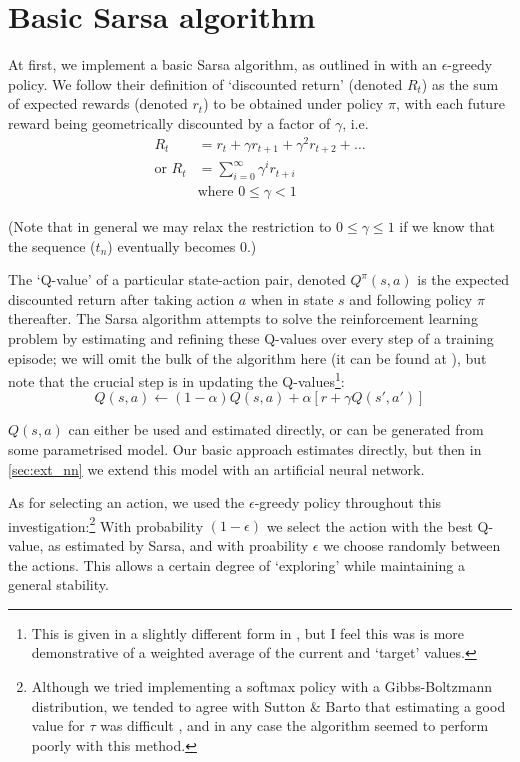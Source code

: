 \documentclass[a4paper, 11pt, twocolumn, final]{article} %
\begin{document}
\section{Basic Sarsa algorithm} At first, we implement a basic Sarsa algorithm, as
outlined in \cite[Chapter~6]{Sutton1998} with an $\epsilon$-greedy policy.  We
follow their definition of `discounted return' (denoted $R_t$) as the sum of
expected rewards (denoted $r_t$) to be obtained under policy $\pi$, with each
future reward being geometrically discounted by a factor of $\gamma$, i.e.
\begin{align}
R_t &= r_t + \gamma r_{t+1} + \gamma^2 r_{t+2} + \ldots \nonumber \\
\text{or } R_t &= \sum_{i=0}^{\infty}{\gamma^ir_{t+i}} \\
&\text{where }0 \le \gamma < 1 \nonumber
\end{align}

(Note that in general we may relax the restriction to $0 \le \gamma \le 1$ if we
know that the sequence ($t_n$) eventually becomes 0.)

The `Q-value' of a particular state-action pair, denoted $Q^\pi(s, a)$ is the
expected discounted return after taking action $a$ when in state $s$ and
following policy $\pi$ thereafter.  The Sarsa algorithm attempts to solve the
reinforcement learning problem by estimating and refining these Q-values over
every step of a training episode; we will omit the bulk of the algorithm here
(it can be found at \cite[p.~146]{Sutton1998}), but note that the crucial step
is in updating the Q-values\footnote{This is given in a slightly different form
in \cite{Sutton1998}, but I feel this was is more demonstrative of a weighted
average of the current and `target' values.}:
\begin{equation}
Q(s, a) \leftarrow (1-\alpha)Q(s, a) + \alpha[r + \gamma Q(s', a')]
\end{equation}

$Q(s, a)$ can either be used and estimated directly, or can be generated from
some parametrised model.  Our basic approach estimates directly, but then in
\autoref{sec:ext_nn} we extend this model with an artificial neural network.

As for selecting an action, we used the $\epsilon$-greedy policy throughout this
investigation:\footnote{Although we tried implementing a softmax policy with a
Gibbs-Boltzmann distribution, we tended to agree with Sutton \& Barto that
estimating a good value for $\tau$ was difficult \cite[p.~31]{Sutton1998}, and
in any case the algorithm seemed to perform poorly with this method.}  With
probability $(1-\epsilon)$ we select the action with the best Q-value, as
estimated by Sarsa, and with proability $\epsilon$ we choose randomly between
the actions.  This allows a certain degree of `exploring' while maintaining a
general stability.
\end{document}
